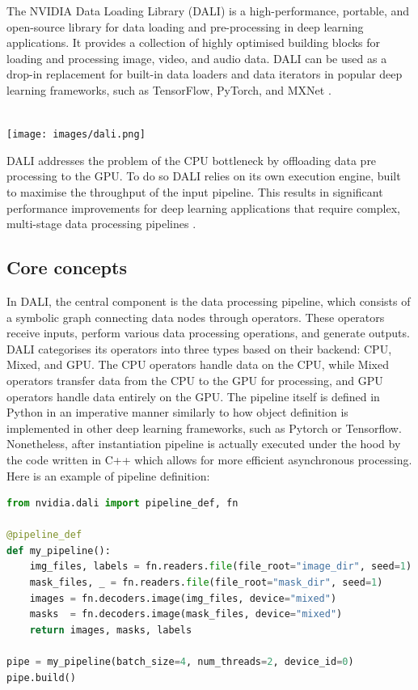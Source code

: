 \documentclass[licencjacka,en]{pracamgr}
\begin{document}
The NVIDIA Data Loading Library (DALI) is a high-performance, portable, and open-source library for data loading and pre-processing in deep learning applications. It provides a collection of highly optimised building blocks for loading and processing image, video, and audio data. DALI can be used as a drop-in replacement for built-in data loaders and data iterators in popular deep learning frameworks, such as TensorFlow, PyTorch, and MXNet \cite{dali-docs}. \\
\\

\centerline{\texttt{[image: images/dali.png]}}

DALI addresses the problem of the CPU bottleneck by offloading data pre processing to the GPU. To do so DALI relies on its own execution engine, built to maximise the throughput of the input pipeline. This results in significant performance improvements for deep learning applications that require complex, multi-stage data processing pipelines \cite{blogpost}. 


\subsection{Core concepts}
In DALI, the central component is the data processing pipeline, which consists of a symbolic graph connecting data nodes through operators. These operators receive inputs, perform various data processing operations, and generate outputs. DALI categorises its operators into three types based on their backend: CPU, Mixed, and GPU. The CPU operators handle data on the CPU, while Mixed operators transfer data from the CPU to the GPU for processing, and GPU operators handle data entirely on the GPU. The pipeline itself is defined in Python in an imperative manner similarly to how object definition is implemented in other deep learning frameworks, such as Pytorch or Tensorflow. Nonetheless, after instantiation pipeline is actually executed under the hood by the code written in C++ which allows for more efficient asynchronous processing. \cite{blogpost}   Here is an example of pipeline definition: \\ 

\begin{lstlisting}[language=Python]
from nvidia.dali import pipeline_def, fn

@pipeline_def  
def my_pipeline():
    img_files, labels = fn.readers.file(file_root="image_dir", seed=1)
    mask_files, _ = fn.readers.file(file_root="mask_dir", seed=1)
    images = fn.decoders.image(img_files, device="mixed")
    masks  = fn.decoders.image(mask_files, device="mixed")
    return images, masks, labels

pipe = my_pipeline(batch_size=4, num_threads=2, device_id=0)
pipe.build()
\end{lstlisting}
\end{document}
